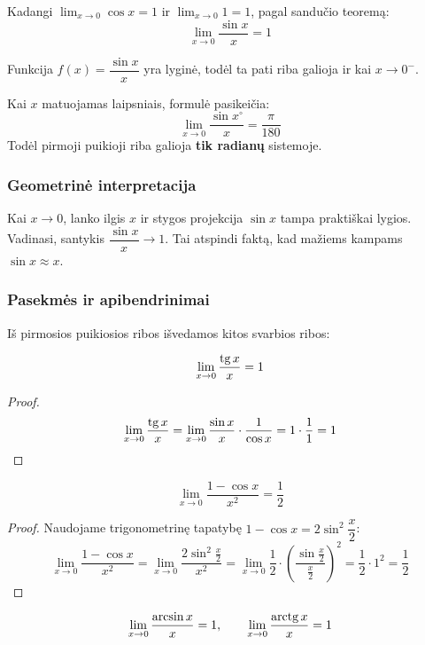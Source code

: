 Kadangi $\lim_{x \to 0} \cos x = 1$ ir $\lim_{x \to 0} 1 = 1$, pagal sandučio teoremą:
\[
  \lim_{x \to 0} \frac{\sin x}{x} = 1
\]

Funkcija $f(x) = \dfrac{\sin x}{x}$ yra lyginė, todėl ta pati riba galioja ir kai $x \to 0^-$.

\begin{remark}
Kai $x$ matuojamas laipsniais, formulė pasikeičia:
\[
  \lim_{x \to 0} \frac{\sin x^\circ}{x} = \frac{\pi}{180}
\]
Todėl pirmoji puikioji riba galioja \textbf{tik radianų} sistemoje.
\end{remark}

\subsubsection*{Geometrinė interpretacija}

Kai $x \to 0$, lanko ilgis $x$ ir stygos projekcija $\sin x$ tampa praktiškai lygios. Vadinasi, santykis $\dfrac{\sin x}{x} \to 1$. Tai atspindi faktą, kad mažiems kampams $\sin x \approx x$.

\subsubsection*{Pasekmės ir apibendrinimai}

Iš pirmosios puikiosios ribos išvedamos kitos svarbios ribos:

\begin{corollary}
\[
  \lim_{x \to 0} \frac{\operatorname{tg} x}{x} = 1
\]
\end{corollary}

\begin{proof}
\[
  \lim_{x \to 0} \frac{\operatorname{tg} x}{x}
  = \lim_{x \to 0} \frac{\sin x}{x} \cdot \frac{1}{\cos x}
  = 1 \cdot \frac{1}{1} = 1
\]
\end{proof}

\begin{corollary}
\[
  \lim_{x \to 0} \frac{1 - \cos x}{x^2} = \frac{1}{2}
\]
\end{corollary}

\begin{proof}
Naudojame trigonometrinę tapatybę $1 - \cos x = 2\sin^2\!\dfrac{x}{2}$:
\[
  \lim_{x \to 0} \frac{1 - \cos x}{x^2}
  = \lim_{x \to 0} \frac{2\sin^2\!\frac{x}{2}}{x^2}
  = \lim_{x \to 0} \frac{1}{2} \cdot \left(\frac{\sin\frac{x}{2}}{\frac{x}{2}}\right)^2
  = \frac{1}{2} \cdot 1^2 = \frac{1}{2}
\]
\end{proof}

\begin{corollary}
\[
  \lim_{x \to 0} \frac{\arcsin x}{x} = 1, \qquad
  \lim_{x \to 0} \frac{\operatorname{arctg} x}{x} = 1
\]
\end{corollary}

